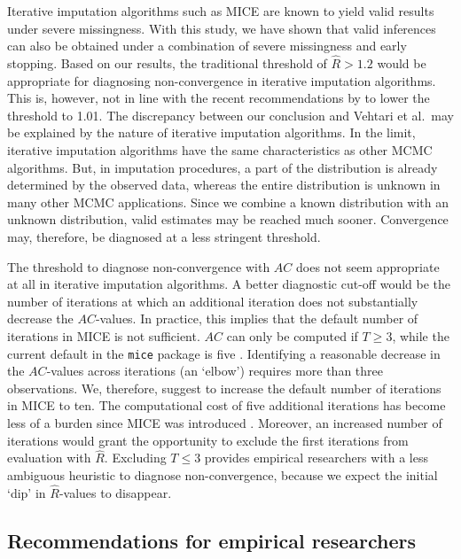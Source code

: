 \documentclass[Royal,times,sageh]{sagej}
\begin{document}
Iterative imputation algorithms such as MICE are known to yield valid results under severe missingness. With this study, we have shown that valid inferences can also be obtained under a combination of severe missingness and early stopping. Based on our results, the traditional threshold of \(\widehat{R}> 1.2\) would be appropriate for diagnosing non-convergence in iterative imputation algorithms. This is, however, not in line with the recent recommendations by \citet{veht19} to lower the threshold to 1.01. The discrepancy between our conclusion and Vehtari et al.~may be explained by the nature of iterative imputation algorithms. In the limit, iterative imputation algorithms have the same characteristics as other MCMC algorithms. But, in imputation procedures, a part of the distribution is already determined by the observed data, whereas the entire distribution is unknown in many other MCMC applications. Since we combine a known distribution with an unknown distribution, valid estimates may be reached much sooner. Convergence may, therefore, be diagnosed at a less stringent threshold.

The threshold to diagnose non-convergence with \(AC\) does not seem appropriate at all in iterative imputation algorithms. A better diagnostic cut-off would be the number of iterations at which an additional iteration does not substantially decrease the \(AC\)-values. In practice, this implies that the default number of iterations in MICE is not sufficient. \(AC\) can only be computed if \(T\geq3\), while the current default in the \texttt{mice} package is five \citep{mice}. Identifying a reasonable decrease in the \(AC\)-values across iterations (an `elbow') requires more than three observations. We, therefore, suggest to increase the default number of iterations in MICE to ten. The computational cost of five additional iterations has become less of a burden since MICE was introduced \citeyearpar{mice}. Moreover, an increased number of iterations would grant the opportunity to exclude the first iterations from evaluation with \(\widehat{R}\). Excluding \(T\leq3\) provides empirical researchers with a less ambiguous heuristic to diagnose non-convergence, because we expect the initial `dip' in \(\widehat{R}\)-values to disappear.

\hypertarget{recommendations-for-empirical-researchers}{%
\subsection{Recommendations for empirical researchers}\label{recommendations-for-empirical-researchers}}
\end{document}
